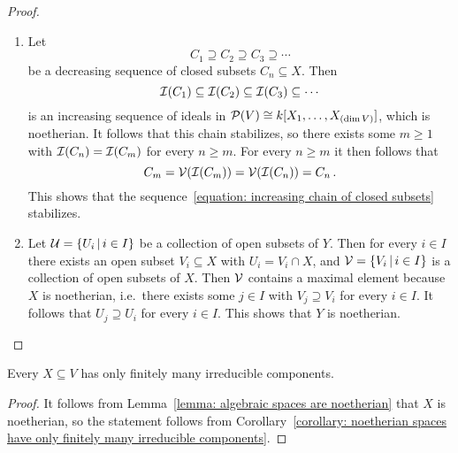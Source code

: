 \begin{proof}
  \leavevmode
  \begin{enumerate}
    \item
      Let
      \begin{equation}
      \label{equation: increasing chain of closed subsets}
                  C_1
        \supseteq C_2
        \supseteq C_3
        \supseteq \dotsb
      \end{equation}
      be a decreasing sequence of closed subsets $C_n \subseteq X$.
      Then
      \[
                  \mathcal{I}(C_1)
        \subseteq \mathcal{I}(C_2)
        \subseteq \mathcal{I}(C_3)
        \subseteq \dotsb
      \]
      is an increasing sequence of ideals in $\mathcal{P}(V) \cong k[X_1, \dotsc, X_{(\dim V)}]$, which is noetherian.
      It follows that this chain stabilizes, so there exists some $m \geq 1$ with $\mathcal{I}(C_n) = \mathcal{I}(C_m)$ for every $n \geq m$.
      For every $n \geq m$ it then follows that
      \[
          C_m
        = \mathcal{V}(\mathcal{I}(C_m))
        = \mathcal{V}(\mathcal{I}(C_n))
        = C_n \,.
      \]
      This shows that the sequence~\eqref{equation: increasing chain of closed subsets} stabilizes.
    \item
      Let $\mc{U} = \{U_i \suchthat i \in I\}$ be a collection of open subsets of $Y$.
      Then for every $i \in I$ there exists an open subset $V_i \subseteq X$ with $U_i = V_i \cap X$, and $\mc{V} = \{V_i \suchthat i \in I\}$ is a collection of open subsets of $X$.
      Then $\mathcal{V}$ contains a maximal element because $X$ is noetherian, i.e.\ there exists some $j \in I$ with $V_j \supseteq V_i$ for every $i \in I$.
      It follows that $U_j \supseteq U_i$ for every $i \in I$.
      This shows that $Y$ is noetherian.
    \qedhere
  \end{enumerate}  
\end{proof}


\begin{corollary}
  Every $X \subseteq V$ has only finitely many irreducible components.
\end{corollary}


\begin{proof}
  It follows from Lemma~\ref{lemma: algebraic spaces are noetherian} that $X$ is noetherian, so the statement follows from Corollary~\ref{corollary: noetherian spaces have only finitely many irreducible components}.
\end{proof}








